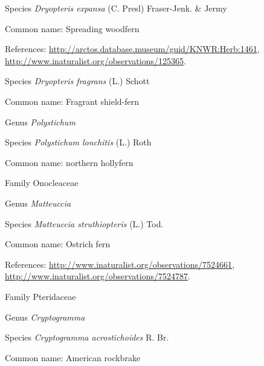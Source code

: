 \documentclass[9pt, article]{memoir}
\begin{document}
\begin{multicols}{2}
\vspace{6pt}\noindent\hspace{36pt}Species \textit{Dryopteris expansa} (C. Presl) Fraser-Jenk. \& Jermy


Common name: Spreading woodfern

References: 
\url{http://arctos.database.museum/guid/KNWR:Herb:1461}, 
\url{http://www.inaturalist.org/observations/125365}.

\vspace{6pt}\noindent\hspace{36pt}Species \textit{Dryopteris fragrans} (L.) Schott


Common name: Fragrant shield-fern

\vspace{6pt}\noindent\hspace{30pt}Genus \textit{Polystichum}


\vspace{6pt}\noindent\hspace{36pt}Species \textit{Polystichum lonchitis} (L.) Roth


Common name: northern hollyfern

\vspace{6pt}\noindent\hspace{24pt}Family Onocleaceae


\vspace{6pt}\noindent\hspace{30pt}Genus \textit{Matteuccia}


\vspace{6pt}\noindent\hspace{36pt}Species \textit{Matteuccia struthiopteris} (L.) Tod.


Common name: Ostrich fern

References: 
\url{http://www.inaturalist.org/observations/7524661}, 
\url{http://www.inaturalist.org/observations/7524787}.

\vspace{6pt}\noindent\hspace{24pt}Family Pteridaceae


\vspace{6pt}\noindent\hspace{30pt}Genus \textit{Cryptogramma}


\vspace{6pt}\noindent\hspace{36pt}Species \textit{Cryptogramma acrostichoides} R. Br.


Common name: American rockbrake


\end{multicols}
\end{document}

